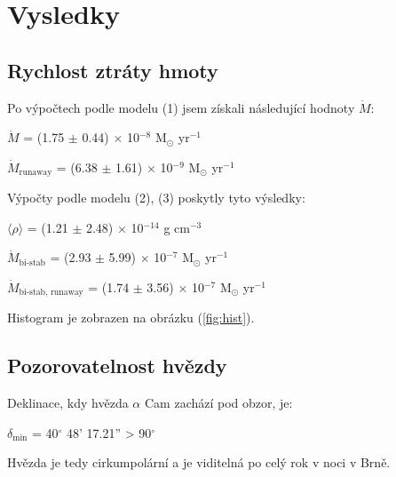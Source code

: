 \documentclass[a4paper,11pt]{article}
\begin{document}
    \begin{minipage}[t]{0.5\textwidth}
        \section{Vysledky}
            \subsection{Rychlost ztráty hmoty}
                Po výpočtech podle modelu (1) jsem získali následující hodnoty $\dot{M}$:
                \begin{center}
                    $\dot{M}$ = (1.75 $\pm$ 0.44) $\times$ 10$^{-8}$ M$_{\odot}$ yr$^{-1}$
                    \vspace{5pt}
                    \par $\dot{M}_{\text{runaway}}$ = (6.38 $\pm$ 1.61) $\times$ 10$^{-9}$ M$_{\odot}$ yr$^{-1}$
                \end{center}
                \par Výpočty podle modelu (2), (3) poskytly tyto výsledky:
                \begin{center}
                    $\langle \rho \rangle$ = (1.21 $\pm$ 2.48) $\times$ 10$^{-14}$ g cm$^{-3}$
                    \vspace{5pt}
                    \par $\dot{M}_{\text{bi-stab}}$ = (2.93 $\pm$ 5.99) $\times$ 10$^{-7}$ M$_{\odot}$ yr$^{-1}$
                    \vspace{5pt}
                    \par $\dot{M}_{\text{bi-stab, runaway}}$ = (1.74 $\pm$ 3.56) $\times$ 10$^{-7}$ M$_{\odot}$ yr$^{-1}$
                \end{center}
                \par Histogram je zobrazen na obrázku (\ref{fig:hist}).
            \subsection{Pozorovatelnost hvězdy}
                Deklinace, kdy hvězda $\alpha$ Cam zachází pod obzor, je:
                \begin{center}
                    $\delta_{\text{min}}$ = 40$^{\circ}$ 48' 17.21'' > 90$^{\circ}$
                \end{center}
                \par Hvězda je tedy cirkumpolární a je viditelná po celý rok v noci v Brně.

\end{minipage}
\end{document}
